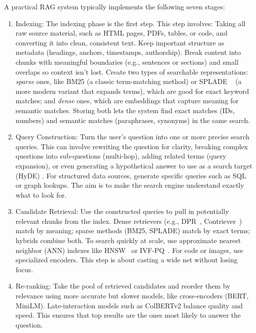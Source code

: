 A practical RAG system typically implements the following seven stages:
\begin{enumerate}
\item Indexing: The indexing phase is the first step. This step involves: Taking all raw source material, such as HTML pages, PDFs, tables, or code, and converting it into clean, consistent text. Keep important structure as metadata (headings, anchors, timestamps, authorship). Break content into chunks with meaningful boundaries (e.g., sentences or sections) and small overlaps so context isn’t lost. Create two types of searchable representations: \emph{sparse} ones, like BM25 (a classic term-matching method) or SPLADE ~\citep{formal2021splade} (a more modern variant that expands terms), which are good for exact keyword matches; and \emph{dense} ones, which are embeddings that capture meaning for semantic matches. Storing both lets the system find exact matches (IDs, numbers) and semantic matches (paraphrases, synonyms) in the same search.

\item Query Construction: Turn the user’s question into one or more precise search queries. This can involve rewriting the question for clarity, breaking complex questions into sub-questions (multi-hop), adding related terms (query expansion), or even generating a hypothetical answer to use as a search target (HyDE) \citep{gao2023hyde}. For structured data sources, generate specific queries such as SQL or graph lookups. The aim is to make the search engine understand exactly what to look for.

\item Candidate Retrieval: Use the constructed queries to pull in potentially relevant chunks from the index. Dense retrievers (e.g., DPR~\citep{karpukhin2020dense}, Contriever~\citep{izacard2022contriever}) match by meaning; sparse methods (BM25, SPLADE) match by exact terms; hybrids combine both. To search quickly at scale, use approximate nearest neighbor (ANN) indexes like HNSW~\citep{malkov2018HNSWG} or IVF-PQ~\citep{herve2011PQNNS}. For code or images, use specialized encoders. This step is about casting a wide net without losing focus.

\item Re-ranking: Take the pool of retrieved candidates and reorder them by relevance using more accurate but slower models, like cross-encoders (BERT, MiniLM). Late-interaction models such as ColBERTv2 \citep{santhanam2022colbertv2} balance quality and speed. This ensures that top results are the ones most likely to answer the question.


\end{enumerate}
